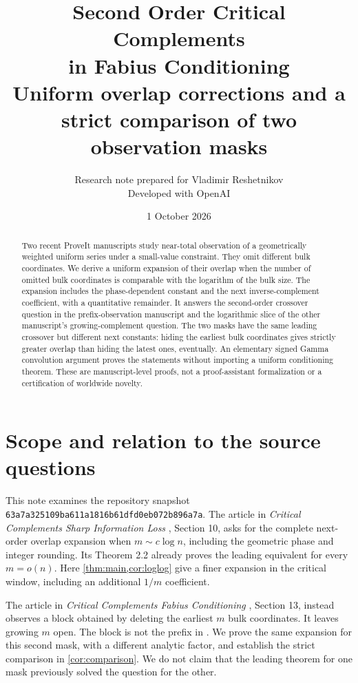 \documentclass[11pt,oneside]{article}
\title{\bfseries Second Order Critical Complements\\in Fabius Conditioning\\[0.4em]
\large Uniform overlap corrections and a strict comparison of two observation masks}
\author{Research note prepared for Vladimir Reshetnikov\\\small Developed with OpenAI}
\date{1 October 2026}
\theoremstyle{remark}\newtheorem{remark}[theorem]{Remark}
\numberwithin{equation}{section}
\begin{document}
\maketitle
\begin{abstract}
Two recent ProveIt manuscripts study near-total observation of a geometrically
weighted uniform series under a small-value constraint. They omit different
bulk coordinates. We derive a uniform expansion of their overlap when the
number of omitted bulk coordinates is comparable with the logarithm of the
bulk size. The expansion includes the phase-dependent constant and the next
inverse-complement coefficient, with a quantitative remainder. It answers the
second-order crossover question in the prefix-observation manuscript and the
logarithmic slice of the other manuscript's growing-complement question.
The two masks have the same leading crossover but different next constants:
hiding the earliest bulk coordinates gives strictly greater overlap than
hiding the latest ones, eventually. An elementary signed Gamma convolution
argument proves the statements without importing a uniform conditioning
theorem. These are manuscript-level proofs, not a proof-assistant
formalization or a certification of worldwide novelty.
\end{abstract}

\section{Scope and relation to the source questions}
This note examines the repository snapshot
\nolinkurl{63a7a325109ba611a1816b61dfd0eb072b896a7a}.
The article in \emph{Critical Complements Sharp Information Loss}
\cite{repo-late}, Section 10, asks for the complete next-order overlap
expansion when $m\sim c\log n$, including the geometric phase and integer
rounding. Its Theorem 2.2 already proves the leading equivalent for every
$m=o(n)$. Here \cref{thm:main,cor:loglog} give a finer expansion in the
critical window, including an additional $1/m$ coefficient.

The article in \emph{Critical Complements Fabius Conditioning}
\cite{repo-early}, Section 13, instead observes a block obtained by deleting
the earliest $m$ bulk coordinates. It leaves growing $m$ open. The block
is not the prefix in \cite{repo-late}. We prove the same expansion for
this second mask, with a different analytic factor, and establish the
strict comparison in \cref{cor:comparison}. We do not claim that the
leading theorem for one mask previously solved the question for the other.
\end{document}
